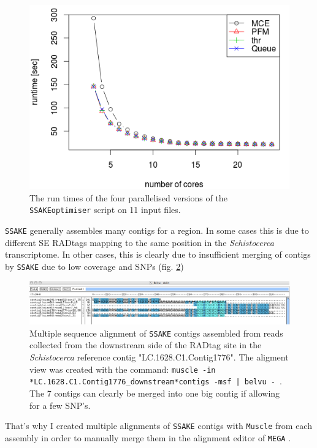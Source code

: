 \documentclass[a4paper,12pt,times,print,index,custombib,custommargin]{PhDThesisPSnPDF}\usepackage[]{graphicx}\usepackage[]{color}
\begin{document}
\begin{figure}
\centering
\includegraphics[width=.9\textwidth]{Parallel_Module_Comp}
\caption{The run times of the four parallelised versions of the \texttt{SSAKEoptimiser} script on 11 input files.}
\label{runtimes}
\end{figure}



\texttt{SSAKE} generally assembles many contigs for a region. In some cases this is due to different SE RADtags mapping to the same position in the \textit{Schistocerca} transcriptome. In other cases, this is clearly due to insufficient merging of contigs by \texttt{SSAKE} due to low coverage and SNPs (fig. \ref{contig_alignment})

\begin{figure}
\centering
\includegraphics[width=\textwidth]{contig_alignment}
\caption{Multiple sequence alignment of \texttt{SSAKE} contigs assembled from reads collected from the downstream side of the RADtag site in the \textit{Schistocerca} reference contig "LC.1628.C1.Contig1776". The aligment view was created with the command: \texttt{muscle -in *LC.1628.C1.Contig1776\_downstream*contigs -msf | belvu -}~. The 7 contigs can clearly be merged into one big contig if allowing for a few SNP's.}
\label{contig_alignment}
\end{figure}

That's why I created multiple alignments of \texttt{SSAKE} contigs with \texttt{Muscle} \citep{Edgar2004} from each assembly in order to manually merge them in the alignment editor of \texttt{MEGA} \citep{Tamura2013}.
\end{document}
